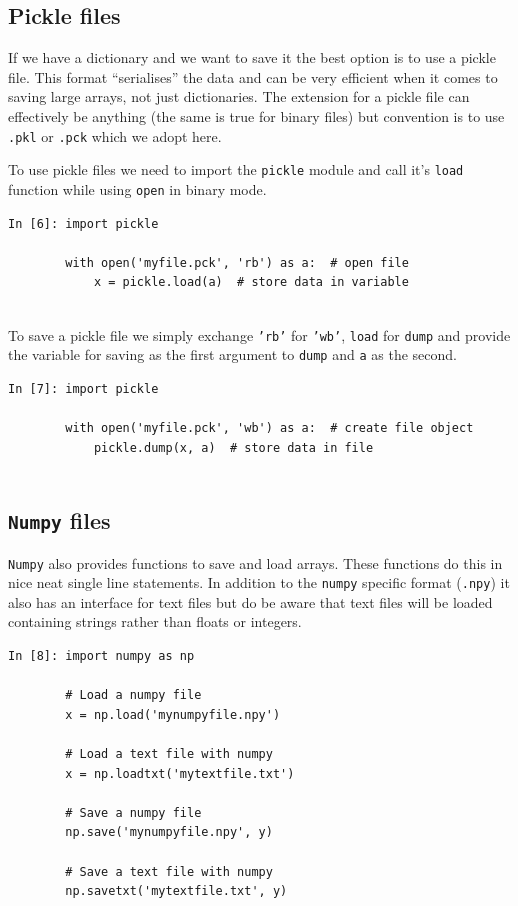 \subsection{Pickle files}

If we have a dictionary and we want to save it the best option is to use a pickle file. This format ``serialises'' the data and can be very efficient when it comes to saving large arrays, not just dictionaries. The extension for a pickle file can effectively be anything (the same is true for binary files) but convention is to use \texttt{.pkl} or \texttt{.pck} which we adopt here.

To use pickle files we need to import the \texttt{pickle} module and call it's \texttt{load} function while using \texttt{open} in binary mode.

\begin{lstlisting}[style=PY]
In [6]: import pickle

        with open('myfile.pck', 'rb') as a:  # open file
            x = pickle.load(a)  # store data in variable 
            
\end{lstlisting}

To save a pickle file we simply exchange \texttt{'rb'} for \texttt{'wb'}, \texttt{load} for \texttt{dump} and provide the variable for saving as the first argument to \texttt{dump} and \texttt{a} as the second.

\begin{lstlisting}[style=PY]
In [7]: import pickle

        with open('myfile.pck', 'wb') as a:  # create file object
            pickle.dump(x, a)  # store data in file
            
\end{lstlisting}

\subsection{\texttt{Numpy} files}

\texttt{Numpy} also provides functions to save and load arrays. These functions do this in nice neat single line statements. In addition to the \texttt{numpy} specific format (\texttt{.npy}) it also has an interface for text files but do be aware that text files will be loaded containing strings rather than floats or integers.

\begin{lstlisting}[style=PY]
In [8]: import numpy as np
        
        # Load a numpy file
        x = np.load('mynumpyfile.npy')
        
        # Load a text file with numpy
        x = np.loadtxt('mytextfile.txt')
        
        # Save a numpy file
        np.save('mynumpyfile.npy', y)
        
        # Save a text file with numpy
        np.savetxt('mytextfile.txt', y)
            
\end{lstlisting}


